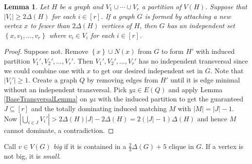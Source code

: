 \documentclass[12pt]{article}
\theoremstyle{plain}
\newtheorem{lem}[thm]{Lemma}
\theoremstyle{definition}
\theoremstyle{remark}
\newcommand{\set}[1]{\left\{ #1 \right\}}
\newcommand{\card}[1]{\left|#1\right|}
\newcommand{\irange}[1]{\left[#1\right]}
\newcommand{\bigclique}[1]{\frac{2}{3}\Delta(#1) + 5}
\begin{document}
\begin{lem}\label{SingletonSetTransversal}
Let $H$ be a graph and $V_1 \cup \cdots \cup V_r$ a partition of $V(H)$. 
Suppose that $\card{V_i} \geq 2\Delta(H)$ for each $i \in \irange{r}$.  If a
graph $G$ is formed by attaching a new vertex $x$ to fewer than $2\Delta(H)$
vertices of $H$,  then $G$ has an independent set $\set{x, v_1, \ldots, v_r}$
where $v_i \in V_i$ for each $i \in \irange{r}$.
\end{lem}
\begin{proof}
Suppose not. Remove $\set{x} \cup N(x)$ from $G$ to form $H'$ with induced
partition $V_1', V_2', \ldots, V_r'$. Then $V_1', V_2', \ldots, V_r'$ has no
independent transversal since we could combine one with $x$ to get our desired
independent set in $G$. Note that $\card{V_i'} \geq 1$. 
Create a graph $Q$ by removing edges from $H'$ until it is edge minimal without
an independent transversal. Pick $yz \in E(Q)$ and apply Lemma
\ref{BaseTransversalLemma} on $yz$ with the induced partition to get the guaranteed 
$J \subseteq \irange{r}$ and the totally dominating induced matching 
$M$ with $\card{M} = \card{J} - 1$. 
Now $\card{\bigcup_{i \in J} V_i'} > 2\Delta(H)\card{J} - 2\Delta(H) =
2(\card{J} - 1)\Delta(H)$ and hence $M$ cannot dominate, a contradiction.
\end{proof}


Call $v \in V(G)$ \emph{big} if it is contained in a $\bigclique{G}$
clique in $G$.  If a vertex is not big, it is \emph{small}.
\end{document}
